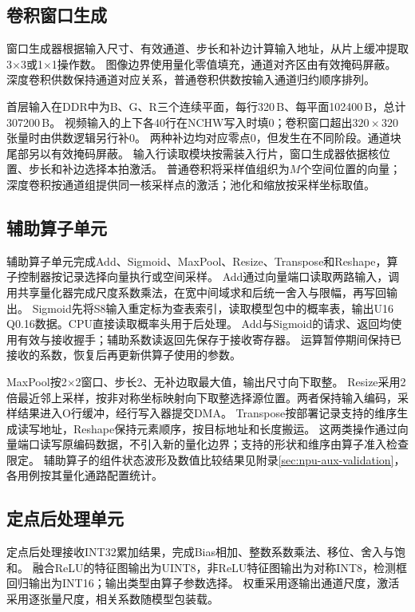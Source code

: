\subsection{卷积窗口生成}

窗口生成器根据输入尺寸、有效通道、步长和补边计算输入地址，从片上缓冲提取3$\times$3或1$\times$1操作数。
图像边界使用量化零值填充，通道对齐区由有效掩码屏蔽。
深度卷积供数保持通道对应关系，普通卷积供数按输入通道归约顺序排列。

首层输入在DDR中为B、G、R三个连续平面，每行320\,B、每平面102400\,B，总计307200\,B。
视频输入的上下各40行在NCHW写入时填0；卷积窗口超出$320\times320$张量时由供数逻辑另行补0。
两种补边均对应零点0，但发生在不同阶段。通道块尾部另以有效掩码屏蔽。
输入行读取模块按需装入行片，窗口生成器依据核位置、步长和补边选择本拍激活。
普通卷积将采样值组织为$M$个空间位置的向量；深度卷积按通道组提供同一核采样点的激活；池化和缩放按采样坐标取值。

\subsection{辅助算子单元}

辅助算子单元完成Add、Sigmoid、MaxPool、Resize、Transpose和Reshape，算子控制器按记录选择向量执行或空间采样。
Add通过向量端口读取两路输入，调用共享量化器完成尺度系数乘法，在宽中间域求和后统一舍入与限幅，再写回输出。
Sigmoid先将S8输入重定标为查表索引，读取模型包中的概率表，输出U16 Q0.16数据。CPU直接读取概率头用于后处理。
Add与Sigmoid的请求、返回均使用有效与接收握手；辅助系数读返回先保存于接收寄存器。
运算暂停期间保持已接收的系数，恢复后再更新供算子使用的参数。

MaxPool按2$\times$2窗口、步长2、无补边取最大值，输出尺寸向下取整。
Resize采用2倍最近邻上采样，按非对称坐标映射向下取整选择源位置。两者保持输入编码，采样结果进入O行缓冲，经行写入器提交DMA。
Transpose按部署记录支持的维序生成读写地址，Reshape保持元素顺序，按目标地址和长度搬运。
这两类操作通过向量端口读写原编码数据，不引入新的量化边界；支持的形状和维序由算子准入检查限定。
辅助算子的组件状态波形及数值比较结果见附录\ref{sec:npu-aux-validation}，各用例按其量化通路配置统计。

\subsection{定点后处理单元}

定点后处理接收INT32累加结果，完成Bias相加、整数系数乘法、移位、舍入与饱和。
融合ReLU的特征图输出为UINT8，非ReLU特征图输出为对称INT8，检测框回归输出为INT16；输出类型由算子参数选择。
权重采用逐输出通道尺度，激活采用逐张量尺度，相关系数随模型包装载。

